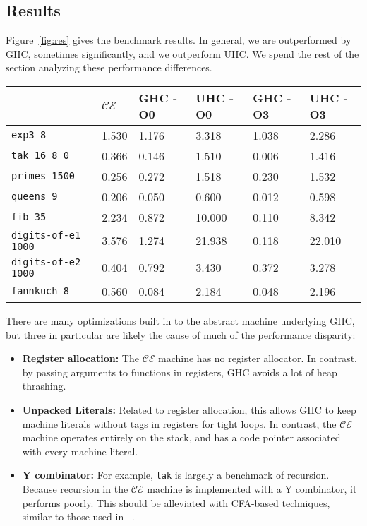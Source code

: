 \subsection{Results} \label{sec:res}

Figure~\ref{fig:res} gives the benchmark results.  In general, we are
outperformed by GHC, sometimes significantly, and we outperform UHC. We
spend the rest of the section analyzing these performance differences.

\begin{figure*}
\centering
\begin{tabularx}{\textwidth}{l | X | X | X | X | X}
& $\mathcal{CE}$ & GHC -O0 & UHC -O0 & GHC -O3 & UHC -O3 \\
\hline
\texttt{exp3 8} & 1.530 & 1.176 & 3.318 & 1.038 & 2.286 \\
\texttt{tak 16 8 0} & 0.366 & 0.146 & 1.510 & 0.006 & 1.416 \\
\texttt{primes 1500} & 0.256 & 0.272 & 1.518 & 0.230 & 1.532 \\
\texttt{queens 9} & 0.206 & 0.050 & 0.600 & 0.012 & 0.598 \\
\texttt{fib 35} & 2.234 & 0.872 & 10.000 & 0.110 & 8.342 \\
\texttt{digits-of-e1 1000} & 3.576 & 1.274 & 21.938 & 0.118 & 22.010 \\
\texttt{digits-of-e2 1000} & 0.404 & 0.792 & 3.430 & 0.372 & 3.278 \\
\texttt{fannkuch 8} & 0.560 & 0.084 & 2.184 & 0.048 & 2.196 \\
\end{tabularx}
\caption{Machine Literals Benchmark Results. Measurement is wall clock time,
units are seconds. Times averaged over 5 runs.}
\label{fig:res}
\end{figure*}

There are many optimizations built in to the abstract machine underlying GHC,
but three in particular are likely the cause of much of the performance disparity: 

\begin{itemize}
\item \textbf{Register allocation:} The $\mathcal{CE}$ machine has no register
allocator. In contrast, by passing arguments to functions in registers, GHC
avoids a lot of heap thrashing.
\item \textbf{Unpacked Literals:} Related to register allocation, this allows
GHC to keep machine literals without tags in registers for tight loops. In
contrast, the $\mathcal{CE}$ machine operates entirely on the stack, and has a
code pointer associated with every machine literal. 
\item \textbf{Y combinator:} For example, \texttt{tak} is largely a benchmark of
recursion.  Because recursion in the $\mathcal{CE}$ machine is implemented with
a Y combinator, it performs poorly. This should be alleviated with CFA-based
techniques, similar to those used in ~\cite{rozas1992taming}. 
\end{itemize}

